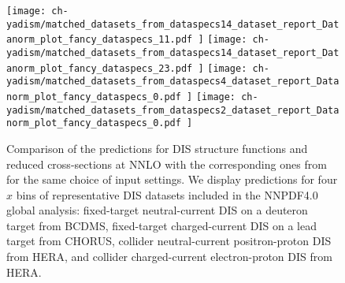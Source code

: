 \begin{figure}[!t]
  \centering
  \texttt{[image: 
    ch-yadism/matched\_datasets\_from\_dataspecs14\_dataset\_report\_Datanorm\_plot\_fancy\_dataspecs\_11.pdf
  ]}
  \texttt{[image: 
    ch-yadism/matched\_datasets\_from\_dataspecs14\_dataset\_report\_Datanorm\_plot\_fancy\_dataspecs\_23.pdf
  ]}
  \texttt{[image: 
    ch-yadism/matched\_datasets\_from\_dataspecs4\_dataset\_report\_Datanorm\_plot\_fancy\_dataspecs\_0.pdf
  ]}
  \texttt{[image: 
    ch-yadism/matched\_datasets\_from\_dataspecs2\_dataset\_report\_Datanorm\_plot\_fancy\_dataspecs\_0.pdf
  ]}
  \caption{
    Comparison of the \yadism predictions for DIS structure
    functions and reduced cross-sections at NNLO with the corresponding ones
    from \apfel for the same choice of input settings.
    We display  predictions for four $x$ bins of representative DIS datasets
    included in the NNPDF4.0 global analysis: fixed-target neutral-current DIS
    on a deuteron target from BCDMS, fixed-target charged-current DIS on a lead
    target from CHORUS, collider neutral-current positron-proton DIS from HERA,
    and collider charged-current electron-proton DIS from HERA.
  }    
  \label{fig/dis:benchmark-apfel-yadism}
\end{figure}
